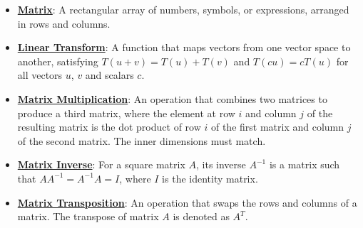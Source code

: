 \documentclass{article}%
\begin{document}
\begin{itemize}[leftmargin=*]%
\item \href{https://purdue.brightspace.com/d2l/common/assets/pdfjs-d2l-dist/1.0.14-legacy/web/viewer.html?file=\%2Fcontent\%2Fenforced\%2F1095467-wl.202510.CS.24300.001\%2F04L1-Linear Algebra Primer.pdf\%3Fou\%3D1095467\&lang=en-us\&container=d2l-fileviewer-rendered-pdf\&fullscreen=d2l-fileviewer-rendered-pdf-dialog\&height=667#page=4}{\textbf{Matrix}}: A rectangular array of numbers, symbols, or expressions, arranged in rows and columns.%
\item \href{https://purdue.brightspace.com/d2l/common/assets/pdfjs-d2l-dist/1.0.14-legacy/web/viewer.html?file=\%2Fcontent\%2Fenforced\%2F1095467-wl.202510.CS.24300.001\%2F04L1-Linear Algebra Primer.pdf\%3Fou\%3D1095467\&lang=en-us\&container=d2l-fileviewer-rendered-pdf\&fullscreen=d2l-fileviewer-rendered-pdf-dialog\&height=667#page=5}{\textbf{Linear Transform}}: A function that maps vectors from one vector space to another, satisfying $T(u + v) = T(u) + T(v)$ and $T(cu) = cT(u)$ for all vectors $u$, $v$ and scalars $c$.%
\item \href{https://purdue.brightspace.com/d2l/common/assets/pdfjs-d2l-dist/1.0.14-legacy/web/viewer.html?file=\%2Fcontent\%2Fenforced\%2F1095467-wl.202510.CS.24300.001\%2F04L1-Linear Algebra Primer.pdf\%3Fou\%3D1095467\&lang=en-us\&container=d2l-fileviewer-rendered-pdf\&fullscreen=d2l-fileviewer-rendered-pdf-dialog\&height=667#page=14}{\textbf{Matrix Multiplication}}: An operation that combines two matrices to produce a third matrix, where the element at row $i$ and column $j$ of the resulting matrix is the dot product of row $i$ of the first matrix and column $j$ of the second matrix. The inner dimensions must match.%
\item \href{https://purdue.brightspace.com/d2l/common/assets/pdfjs-d2l-dist/1.0.14-legacy/web/viewer.html?file=\%2Fcontent\%2Fenforced\%2F1095467-wl.202510.CS.24300.001\%2F04L1-Linear Algebra Primer.pdf\%3Fou\%3D1095467\&lang=en-us\&container=d2l-fileviewer-rendered-pdf\&fullscreen=d2l-fileviewer-rendered-pdf-dialog\&height=667#page=10}{\textbf{Matrix Inverse}}: For a square matrix $A$, its inverse $A^{-1}$ is a matrix such that $AA^{-1} = A^{-1}A = I$, where $I$ is the identity matrix.%
\item \href{https://purdue.brightspace.com/d2l/common/assets/pdfjs-d2l-dist/1.0.14-legacy/web/viewer.html?file=\%2Fcontent\%2Fenforced\%2F1095467-wl.202510.CS.24300.001\%2F04L1-Linear Algebra Primer.pdf\%3Fou\%3D1095467\&lang=en-us\&container=d2l-fileviewer-rendered-pdf\&fullscreen=d2l-fileviewer-rendered-pdf-dialog\&height=667#page=16}{\textbf{Matrix Transposition}}: An operation that swaps the rows and columns of a matrix. The transpose of matrix $A$ is denoted as $A^T$.%

\end{itemize}
\end{document}
